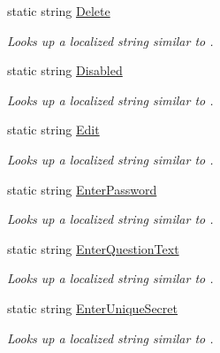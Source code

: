 \begin{DoxyCompactItemize}
static string \hyperlink{class_wis_r_1_1_app___resources_1_1_resource_a5441db4935202f789e69b51badd2664f}{Delete}
\begin{DoxyCompactList}\small\item\em Looks up a localized string similar to . \end{DoxyCompactList}\item 
static string \hyperlink{class_wis_r_1_1_app___resources_1_1_resource_a5c92b3d50f5d6257774b9d9da8739fd2}{Disabled}
\begin{DoxyCompactList}\small\item\em Looks up a localized string similar to . \end{DoxyCompactList}\item 
static string \hyperlink{class_wis_r_1_1_app___resources_1_1_resource_a54c0b0eeef9600c4b44e26713c998d7b}{Edit}
\begin{DoxyCompactList}\small\item\em Looks up a localized string similar to . \end{DoxyCompactList}\item 
static string \hyperlink{class_wis_r_1_1_app___resources_1_1_resource_ab6fbbdd3b307781efa26d004f0f6c29d}{Enter\+Password}
\begin{DoxyCompactList}\small\item\em Looks up a localized string similar to . \end{DoxyCompactList}\item 
static string \hyperlink{class_wis_r_1_1_app___resources_1_1_resource_ab026ee7ab016fee825fbe02ba8305b56}{Enter\+Question\+Text}
\begin{DoxyCompactList}\small\item\em Looks up a localized string similar to . \end{DoxyCompactList}\item 
static string \hyperlink{class_wis_r_1_1_app___resources_1_1_resource_af9d74b6e71b6b18bfcca8bd45b5c8ec9}{Enter\+Unique\+Secret}
\begin{DoxyCompactList}\small\item\em Looks up a localized string similar to . \end{DoxyCompactList}\item 

\end{DoxyCompactItemize}
